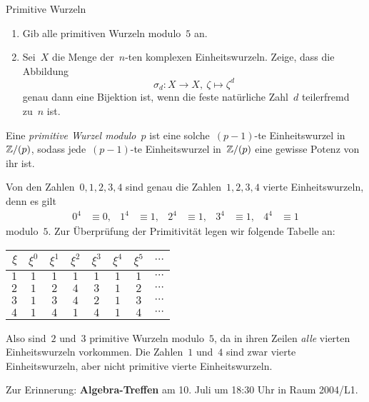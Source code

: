 \documentclass{algblatt}
\begin{document}
\begin{aufgabe}{Primitive Wurzeln}
\begin{enumerate}
\item Gib alle primitiven Wurzeln modulo~$5$ an.

\item Sei~$X$ die Menge der~$n$-ten komplexen Einheitswurzeln. Zeige, dass die
Abbildung
\[ \sigma_d : X \longrightarrow X,\ \zeta \longmapsto \zeta^d \]
genau dann eine Bijektion ist, wenn die feste natürliche Zahl~$d$ teilerfremd
zu~$n$ ist.
\end{enumerate}

\begin{loesungE}
\item Eine \emph{primitive Wurzel modulo~$p$} ist eine solche~$(p-1)$-te
Einheitswurzel in~$\mathbb{Z}/(p)$, sodass jede~$(p-1)$-te Einheitswurzel in~$\mathbb{Z}/(p)$
eine gewisse Potenz von ihr ist.

Von den Zahlen~$0,1,2,3,4$ sind genau die Zahlen~$1,2,3,4$ vierte
Einheitswurzeln, denn es gilt
\begin{align*}
  0^4 &\equiv 0, & 1^4 &\equiv 1, & 2^4 &\equiv 1, & 3^4 &\equiv 1, &
  4^4 &\equiv 1
\end{align*}
modulo~$5$. Zur Überprüfung der Primitivität legen wir folgende Tabelle an:
\begin{center}
  \begin{tabular}{r|c|c|c|c|c|c|c}
    $\xi$ & $\xi^0$ & $\xi^1$ & $\xi^2$ & $\xi^3$ & $\xi^4$ & $\xi^5$ & $\cdots$ \\\hline
    $1$ & $1$ & $1$ & $1$ & $1$ & $1$ & $1$ & $\cdots$ \\
    $2$ & $1$ & $2$ & $4$ & $3$ & $1$ & $2$ & $\cdots$ \\
    $3$ & $1$ & $3$ & $4$ & $2$ & $1$ & $3$ & $\cdots$ \\
    $4$ & $1$ & $4$ & $1$ & $4$ & $1$ & $4$ & $\cdots$
  \end{tabular}
\end{center}
Also sind~$2$ und~$3$ primitive Wurzeln modulo~$5$, da in ihren Zeilen
\emph{alle} vierten Einheitswurzeln vorkommen. Die Zahlen~$1$ und~$4$ sind zwar
vierte Einheitswurzeln, aber nicht primitive vierte Einheitswurzeln.
\end{loesungE}
\end{aufgabe}

Zur Erinnerung: \textbf{Algebra-Treffen} am 10. Juli um 18:30 Uhr in Raum
2004/L1.
\end{document}
